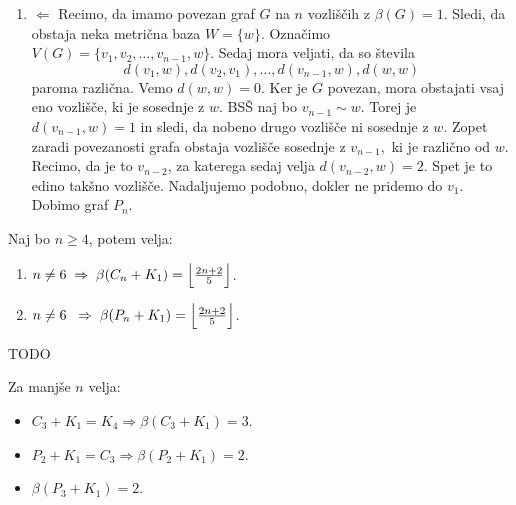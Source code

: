 \documentclass[mat1, tisk]{fmfdelo}
\newcommand{\1}{(1, 1, \ldots, 1)}
\newcommand{\2}{(2, 2, \ldots, 2)}
\begin{document}
\begin{dokaz}
\begin{enumerate}
        \item $\Leftarrow$
        Recimo, da imamo povezan graf $G$ na $n$ vozliščih z $\beta(G) = 1.$ Sledi, da obstaja neka 
        metrična baza $W = \{ w \}.$ Označimo $V(G) = \{ v_1, v_2, \ldots , v_{n-1}, w\}.$ Sedaj mora 
        veljati, da so števila 
        $$ d(v_1, w),  d(v_2, v_1), \ldots, d(v_{n-1}, w), d(w, w) $$
        paroma različna. Vemo $d(w, w) = 0$. Ker je $G$ povezan, mora obstajati vsaj eno vozlišče, 
        ki je sosednje z $w$. BSŠ naj bo $v_{n-1} \sim w$. Torej je $d(v_{n-1}, w) = 1$ in sledi, 
        da nobeno drugo vozlišče ni sosednje z $w$. Zopet zaradi povezanosti grafa obstaja vozlišče 
        sosednje z $v_{n-1},$ ki je različno od $w$. Recimo, da je to $v_{n-2}$, za katerega sedaj 
        velja $d(v_{n-2}, w) = 2.$ Spet je to edino takšno vozlišče. Nadaljujemo podobno, 
        dokler ne pridemo do $v_1.$ Dobimo graf $P_n.$
    \end{enumerate}
\end{dokaz}


\begin{trditev} \label{trd:mdim_spojev}
    Naj bo $n\geq 4$, potem velja:
    \begin{enumerate}
        \item $n \neq 6 \; \Rightarrow \; \beta(C_n + K_1) = 
        \Bigl \lfloor \frac{2n + 2}{5}\Bigr \rfloor$.
        \item $n \neq 6 \; \; \Rightarrow \; \beta(P_n + K_1) = 
        \Bigl \lfloor \frac{2n + 2}{5}\Bigr \rfloor$.
    \end{enumerate}
\end{trditev}

\begin{dokaz}
    TODO
\end{dokaz}

\begin{opomba}
    Za manjše $n$ velja:
    \begin{itemize}
        \item $C_3 + K_1 = K_4 \Rightarrow \beta(C_3 + K_1) = 3.$
        \item $P_2 + K_1 = C_3 \Rightarrow \beta(P_2 + K_1) = 2.$
        \item $\beta(P_3 + K_1) = 2.$
    \end{itemize}
    
\end{opomba}


\end{document}
